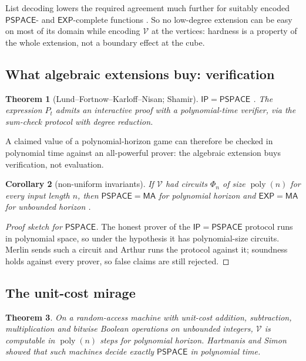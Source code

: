 \documentclass[11pt]{amsart}
\theoremstyle{plain}
\newtheorem{theorem}{Theorem}[section]
\newtheorem{corollary}[theorem]{Corollary}
\theoremstyle{definition}
\theoremstyle{remark}
\numberwithin{equation}{section}
\newcommand{\val}{\mathcal{V}}            %
\newcommand{\poly}{\operatorname{poly}}
\newcommand{\cls}[1]{\mathsf{#1}}
\newcommand{\PSPACE}{\cls{PSPACE}}
\newcommand{\EXP}{\cls{EXP}}
\newcommand{\MA}{\cls{MA}}
\newcommand{\IP}{\cls{IP}}
\begin{document}
List decoding lowers the required agreement much further for suitably encoded $\PSPACE$- and $\EXP$-complete functions \cite{STV,TrevisanVadhan}. So no low-degree extension can be easy on most of its domain while encoding $\val$ at the vertices: hardness is a property of the whole extension, not a boundary effect at the cube.

\subsection{What algebraic extensions buy: verification}
\begin{theorem}[Lund--Fortnow--Karloff--Nisan; Shamir]\label{thm:ip}
$\IP=\PSPACE$ \cite{LFKN,Shamir}. The expression $P_t$ admits an interactive proof with a polynomial-time verifier, via the sum-check protocol with degree reduction.
\end{theorem}
A claimed value of a polynomial-horizon game can therefore be checked in polynomial time against an all-powerful prover: the algebraic extension buys verification, not evaluation.

\begin{corollary}[non-uniform invariants]\label{cor:nonuniform}
If $\val$ had circuits $\Phi_n$ of size $\poly(n)$ for every input length $n$, then $\PSPACE=\MA$ for polynomial horizon and $\EXP=\MA$ for unbounded horizon \cite{BFNW}.
\end{corollary}
\begin{proof}[Proof sketch for $\PSPACE$]
The honest prover of the $\IP=\PSPACE$ protocol runs in polynomial space, so under the hypothesis it has polynomial-size circuits. Merlin sends such a circuit and Arthur runs the protocol against it; soundness holds against every prover, so false claims are still rejected.
\end{proof}

\subsection{The unit-cost mirage}
\begin{theorem}\label{thm:unit-cost}
On a random-access machine with unit-cost addition, subtraction, multiplication and bitwise Boolean operations on unbounded integers, $\val$ is computable in $\poly(n)$ steps for polynomial horizon. Hartmanis and Simon \cite{HartmanisSimon} showed that such machines decide exactly $\PSPACE$ in polynomial time.
\end{theorem}
\end{document}
